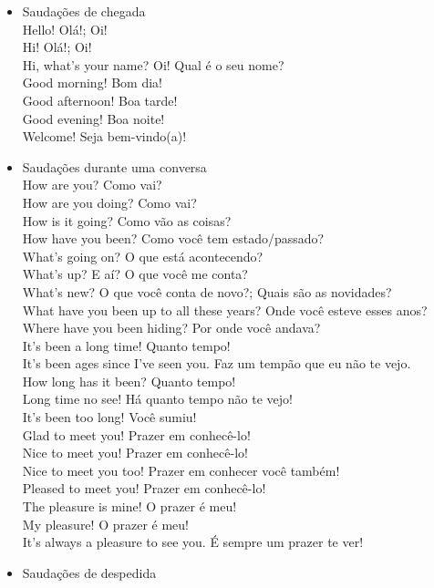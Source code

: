 \documentclass[12pt,a4paper]{article} %
\begin{document}
\begin{itemize}
\item Saudações de chegada\\
Hello! 	Olá!; Oi!\\
Hi! 	Olá!; Oi!\\
Hi, what's your name? 	Oi! Qual é o seu nome?\\
Good morning! 	Bom dia!\\
Good afternoon! 	Boa tarde!\\
Good evening! 	Boa noite!\\
Welcome! 	Seja bem-vindo(a)!
\item Saudações durante uma conversa\\
How are you? 	Como vai?\\
How are you doing? 	Como vai?\\
How is it going? 	Como vão as coisas?\\
How have you been? 	Como você tem estado/passado?\\
What's going on? 	O que está acontecendo?\\
What's up? 	E aí? O que você me conta?\\
What's new? 	O que você conta de novo?; Quais são as novidades?\\
What have you been up to all these years? 	Onde você esteve esses anos?\\
Where have you been hiding? 	Por onde você andava?\\
It's been a long time! 	Quanto tempo!\\
It’s been ages since I’ve seen you. 	Faz um tempão que eu não te vejo.\\
How long has it been? 	Quanto tempo!\\
Long time no see! 	Há quanto tempo não te vejo!\\
It's been too long! 	Você sumiu!\\
Glad to meet you! 	Prazer em conhecê-lo!\\
Nice to meet you! 	Prazer em conhecê-lo!\\
Nice to meet you too! 	Prazer em conhecer você também!\\
Pleased to meet you! 	Prazer em conhecê-lo!\\
The pleasure is mine! 	O prazer é meu!\\
My pleasure! 	O prazer é meu!\\
It’s always a pleasure to see you. 	É sempre um prazer te ver!
\item Saudações de despedida\\

\end{itemize}
\end{document}
